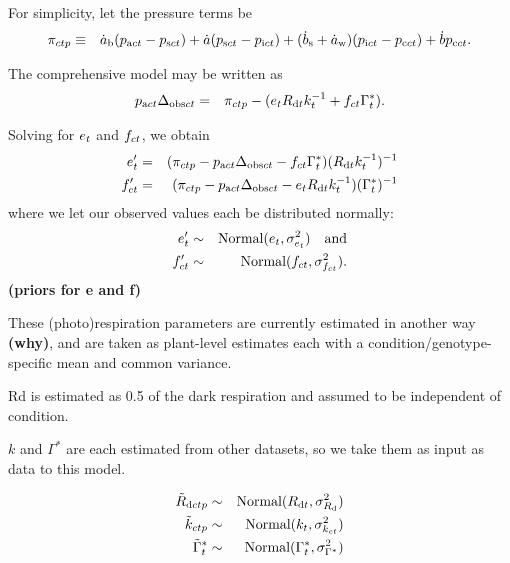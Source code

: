 \documentclass[12pt]{article}
\begin{document}
For simplicity, let the pressure terms be
\begin{eqnarray}
  \pi_{ctp}
    & \equiv &
  \dot{a}_{\textrm{b}}(p_{\textrm{a}ct}-p_{\textrm{s}ct})+\dot{a}(p_{\textrm{s}ct}-p_{\textrm{i}ct})+(\dot{b}_{\textrm{s}}+\dot{a}_{\textrm{w}})(p_{\textrm{i}ct}-p_{\textrm{c}ct}) + \dot{b}p_{\textrm{c}ct}.
\nonumber
\end{eqnarray}

The comprehensive model may be written as
\begin{eqnarray}
  p_{\textrm{a}ct}\Delta_{\textrm{obs}ct}
    & = &
  \pi_{ctp} - ( e_{t}R_{\textrm{d}t}k_{t}^{-1} + f_{ct}\Gamma^{\ast}_{t} ).
\nonumber
\end{eqnarray}

Solving for $e_{t}$ and $f_{ct}$, we obtain
\begin{eqnarray}
  \sseprime
    & = &
  (\sallpressures - \spa\sDeltaobs - \ssf\sGammastar )(\sRd\ssk^{-1})^{-1}
\nonumber\\ %
  \ssfprime
    & = &
  (\sallpressures - \spa\sDeltaobs - \sse\sRd\ssk^{-1} )(\sGammastar)^{-1}
\nonumber
\end{eqnarray}
where we let our observed values each be distributed normally:
\begin{eqnarray}
  \sseprime
    & \sim &
  \Normal(\sse,\sdatasig{\sse}) \quad\textrm{and}
\nonumber\\ %
  \ssfprime
    & \sim &
  \Normal(\ssf,\sdatasig{\ssf}).
\nonumber
\end{eqnarray}
{\bf (priors for e and f)}

These (photo)respiration parameters are currently estimated in another way {\bf (why)},
and are taken as plant-level estimates each with a condition/genotype-specific mean
  and common variance.

Rd is estimated as 0.5 of the dark respiration and assumed to be independent of condition.

$k$ and $\Gamma^{\ast}$ are each estimated from other datasets,
  so we take them as input as data to this model.

\begin{eqnarray}
  \sdataRd
    & \sim &
  \Normal(\sRd,\ssigRd)
\nonumber\\ %
  \sdatak
    & \sim &
  \Normal(\ssk,\ssigk)
\nonumber\\ %
  \sdataGammastar
    & \sim &
  \Normal(\sGammastar,\ssigGammastar)
\nonumber
\end{eqnarray}
\end{document}
